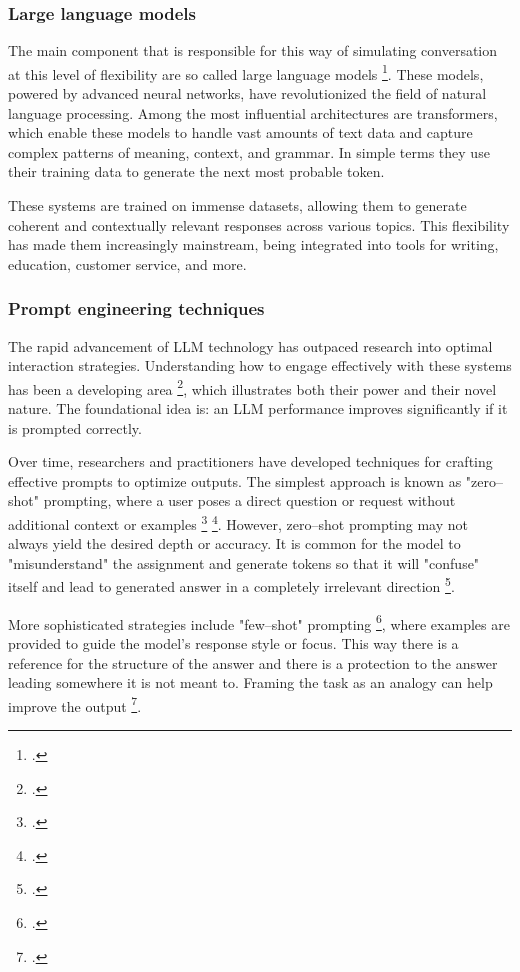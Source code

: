 \documentclass[12pt]{report}
\begin{document}
{\subsubsection{Large language models}

The main component that is responsible for
this way of simulating conversation at this level of flexibility
are so called large language models \footcite{naveed2023comprehensive}.
These models, powered by advanced neural networks,
have revolutionized the field of natural language processing.
Among the most influential architectures are transformers,
which enable these models to handle
vast amounts of text data and capture complex patterns of meaning, context, and grammar.
In simple terms they use their training data to generate the next most probable token.

These systems are trained on immense datasets,
allowing them to generate coherent and contextually relevant responses across various topics.
This flexibility has made them increasingly mainstream,
being integrated into tools for writing, education, customer service, and more.

\subsubsection{Prompt engineering techniques}

The rapid advancement of LLM technology
has outpaced research into optimal interaction strategies.
Understanding how to engage effectively
with these systems has been a developing area \footcite{sahoo2024systematic},
which illustrates both their power and their novel nature.
The foundational idea is:
an LLM performance improves significantly if it is prompted correctly.

Over time, researchers and practitioners have developed techniques for
crafting effective prompts to optimize outputs.
The simplest approach is known as "zero–shot" prompting,
where a user poses a direct question or request without additional context or examples \footcite{kong2023better} \footcite{li2023practical}.
However, zero–shot prompting may not always yield the desired depth or accuracy.
It is common for the model to "misunderstand" the assignment
and generate tokens so that it will "confuse" itself
and lead to generated answer in a completely irrelevant direction \footcite{hwang2025llms}.

More sophisticated strategies include "few–shot" prompting \footcite{yao2023more},
where examples are provided to guide the model's response style or focus.
This way there is a reference for the structure of the answer
and there is a protection to the answer leading somewhere it is not meant to.
Framing the task as an analogy can help improve the output \footcite{stevenson2024can, qin2024relevant}.

}
\end{document}

